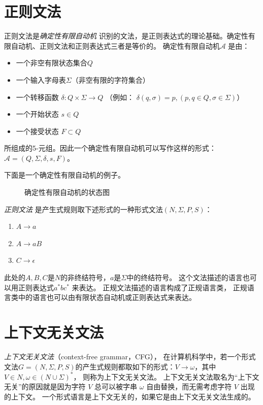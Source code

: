 \section{正则文法}
\def\DFA{确定性有限自动机}
正则文法是\emph{\DFA} 识别的文法，是正则表达式的理论基础。\DFA 、正则文法和正则表达式三者是等价的。
\DFA $\mathcal{A}$ 是由：
\begin{itemize}
        \item 一个非空有限状态集合$Q$
        \item 一个输入字母表$\Sigma$（非空有限的字符集合）
        \item 一个转移函数 $ \delta: Q \times \Sigma \rightarrow Q $ 
                （例如： $ \delta(q, \sigma) = p, (p, q \in Q, \sigma \in \Sigma) $）
        \item 一个开始状态 $ s \in Q $
        \item 一个接受状态 $ F \subset Q $
\end{itemize}
所组成的5-元组。因此一个\DFA 可以写作这样的形式：
$ \mathcal{A} = (Q, \Sigma, \delta, s, F) $。

下面是一个\DFA 的例子。
\begin{figure}[H]
        \centering
        
        \caption{\DFA 的状态图}
        \label{fig:DFAexample}
\end{figure}
\emph{正则文法} 是产生式规则取下述形式的一种形式文法$ (N, \Sigma, P, S) $：
\begin{enumerate}
        \item $A \rightarrow a$
        \item $A \rightarrow aB$
        \item $C \rightarrow \epsilon$
\end{enumerate}
此处的$A, B, C$是$N$的非终结符号，$a$是$\Sigma$中的终结符号。
这个文法描述的语言也可以用正则表达式$a^{*}bc^{*}$ 来表达。
正规文法描述的语言构成了正规语言类，
正规语言类中的语言也可以由有限状态自动机或正则表达式来表达。

\section{上下文无关文法}
\def\CFGTuple{$G = (N, \Sigma, P, S)$}
\emph{上下文无关文法}（context-free grammar，CFG），
在计算机科学中，若一个形式文法\CFGTuple 的产生式规则都取如下的形式：$V \rightarrow \omega$，其中$ V \in N, \omega \in (N \cup \Sigma)^{*} $，
则称为上下文无关文法。
上下文无关文法取名为“上下文无关”的原因就是因为字符 $V$ 总可以被字串 $\omega$ 自由替换，而无需考虑字符 $V$ 出现的上下文。
一个形式语言是上下文无关的，如果它是由上下文无关文法生成的。

